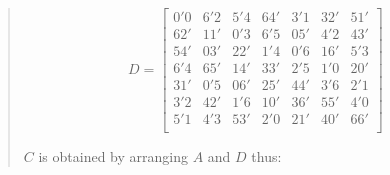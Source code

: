 \documentclass[
  11pt,
  a4paper]{book}
\begin{document}
\begin{quote}
\begin{equation}
  D = \begin{bmatrix}
      0'0 & 6'2 & 5'4 & 64' & 3'1 & 32' & 51'  \\
      62' & 11' & 0'3 & 6'5 & 05' & 4'2 & 43'  \\
      54' & 03' & 22' & 1'4 & 0'6 & 16' & 5'3  \\
      6'4 & 65' & 14' & 33' & 2'5 & 1'0 & 20'  \\
      31' & 0'5 & 06' & 25' & 44' & 3'6 & 2'1  \\
      3'2 & 42' & 1'6 & 10' & 36' & 55' & 4'0  \\
      5'1 & 4'3 & 53' & 2'0 & 21' & 40' & 66'  \\
  \end{bmatrix}
\end{equation}

$C$ is obtained by arranging $A$ and $D$ thus:


\end{quote}
\end{document}
